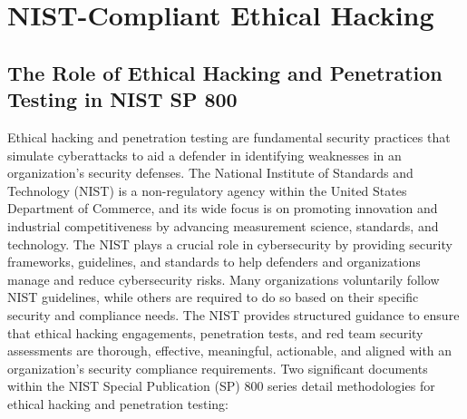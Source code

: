 \section{NIST-Compliant Ethical Hacking}

\subsection{The Role of Ethical Hacking and Penetration Testing in NIST SP 800}
Ethical hacking and penetration testing are fundamental security practices that simulate cyberattacks to aid a defender in identifying weaknesses in an organization's security defenses. The National Institute of Standards and Technology (NIST) is a non-regulatory agency within the United States Department of Commerce, and its wide focus is on promoting innovation and industrial competitiveness by advancing measurement science, standards, and technology. The NIST plays a crucial role in cybersecurity by providing security frameworks, guidelines, and standards to help defenders and organizations manage and reduce cybersecurity risks. Many organizations voluntarily follow NIST guidelines, while others are required to do so based on their specific security and compliance needs. The NIST provides structured guidance to ensure that ethical hacking engagements, penetration tests, and red team security assessments are thorough, effective, meaningful, actionable, and aligned with an organization's security compliance requirements.
Two significant documents within the NIST Special Publication (SP) 800 series detail methodologies for ethical hacking and penetration testing:
